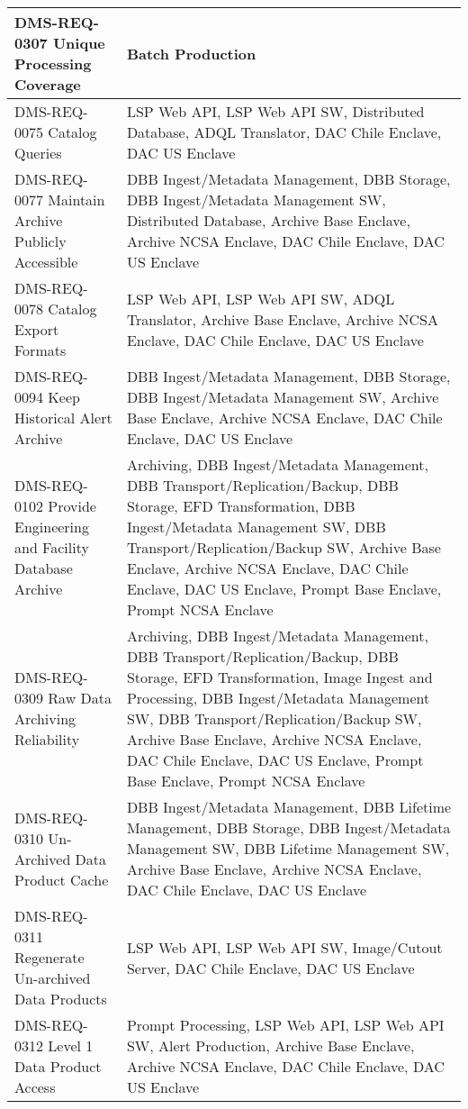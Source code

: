 \begin{xtabular}{p{0.4\textwidth}p{0.55\textwidth}}
DMS-REQ-0307 Unique Processing Coverage & Batch Production \\ \hline
DMS-REQ-0075 Catalog Queries & LSP Web API, LSP Web API SW, Distributed Database, ADQL Translator, DAC Chile Enclave, DAC US Enclave \\ \hline
DMS-REQ-0077 Maintain Archive Publicly Accessible & DBB Ingest/Metadata Management, DBB Storage, DBB Ingest/Metadata Management SW, Distributed Database, Archive Base Enclave, Archive NCSA Enclave, DAC Chile Enclave, DAC US Enclave \\ \hline
DMS-REQ-0078 Catalog Export Formats & LSP Web API, LSP Web API SW, ADQL Translator, Archive Base Enclave, Archive NCSA Enclave, DAC Chile Enclave, DAC US Enclave \\ \hline
DMS-REQ-0094 Keep Historical Alert Archive & DBB Ingest/Metadata Management, DBB Storage, DBB Ingest/Metadata Management SW, Archive Base Enclave, Archive NCSA Enclave, DAC Chile Enclave, DAC US Enclave \\ \hline
DMS-REQ-0102 Provide Engineering and Facility Database Archive & Archiving, DBB Ingest/Metadata Management, DBB Transport/Replication/Backup, DBB Storage, EFD Transformation, DBB Ingest/Metadata Management SW, DBB Transport/Replication/Backup SW, Archive Base Enclave, Archive NCSA Enclave, DAC Chile Enclave, DAC US Enclave, Prompt Base Enclave, Prompt NCSA Enclave \\ \hline
DMS-REQ-0309 Raw Data Archiving Reliability & Archiving, DBB Ingest/Metadata Management, DBB Transport/Replication/Backup, DBB Storage, EFD Transformation, Image Ingest and Processing, DBB Ingest/Metadata Management SW, DBB Transport/Replication/Backup SW, Archive Base Enclave, Archive NCSA Enclave, DAC Chile Enclave, DAC US Enclave, Prompt Base Enclave, Prompt NCSA Enclave \\ \hline
DMS-REQ-0310 Un-Archived Data Product Cache & DBB Ingest/Metadata Management, DBB Lifetime Management, DBB Storage, DBB Ingest/Metadata Management SW, DBB Lifetime Management SW, Archive Base Enclave, Archive NCSA Enclave, DAC Chile Enclave, DAC US Enclave \\ \hline
DMS-REQ-0311 Regenerate Un-archived Data Products & LSP Web API, LSP Web API SW, Image/Cutout Server, DAC Chile Enclave, DAC US Enclave \\ \hline
DMS-REQ-0312 Level 1 Data Product Access & Prompt Processing, LSP Web API, LSP Web API SW, Alert Production, Archive Base Enclave, Archive NCSA Enclave, DAC Chile Enclave, DAC US Enclave \\ \hline

\end{xtabular}
